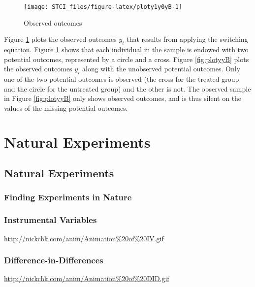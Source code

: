 \documentclass[]{book}
\theoremstyle{definition}
\theoremstyle{definition}
\theoremstyle{definition}
\theoremstyle{remark}
\begin{document}
\begin{figure}

{\centering \texttt{[image: STCI\_files/figure-latex/ploty1y0yB-1]} 

}

\caption{Observed outcomes}\label{fig:ploty1y0yB}
\end{figure}

Figure \ref{fig:ploty1y0yB} plots the observed outcomes \(y_i\) that
results from applying the switching equation. Figure
\ref{fig:ploty1y0yB} shows that each individual in the sample is endowed
with two potential outcomes, represented by a circle and a cross. Figure
\ref{fig:plotyyB} plots the observed outcomes \(y_i\) along with the
unobserved potential outcomes. Only one of the two potential outcomes is
observed (the cross for the treated group and the circle for the
untreated group) and the other is not. The observed sample in Figure
\ref{fig:plotyyB} only shows observed outcomes, and is thus silent on
the values of the missing potential outcomes.

\part{Natural Experiments}\label{part-natural-experiments}

\chapter{Natural Experiments}\label{natural-experiments}

\section{Finding Experiments in
Nature}\label{finding-experiments-in-nature}

\section{Instrumental Variables}\label{instrumental-variables}

\url{http://nickchk.com/anim/Animation%20of%20IV.gif}

\section{Difference-in-Differences}\label{difference-in-differences}

\url{http://nickchk.com/anim/Animation%20of%20DID.gif}
\end{document}
